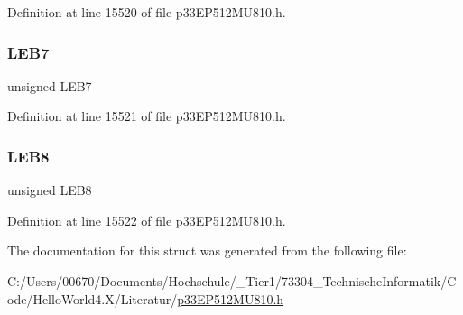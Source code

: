 Definition at line 15520 of file p33\+E\+P512\+M\+U810.\+h.

\mbox{\label{structtag_l_e_b_d_l_y6_b_i_t_s_aa76d586b04119d8459718019ddd964ef}} 
\subsubsection{\texorpdfstring{L\+E\+B7}{LEB7}}
{\footnotesize\ttfamily unsigned L\+E\+B7}



Definition at line 15521 of file p33\+E\+P512\+M\+U810.\+h.

\mbox{\label{structtag_l_e_b_d_l_y6_b_i_t_s_a9b22b47001301c6ae00c3eea0f385091}} 
\subsubsection{\texorpdfstring{L\+E\+B8}{LEB8}}
{\footnotesize\ttfamily unsigned L\+E\+B8}



Definition at line 15522 of file p33\+E\+P512\+M\+U810.\+h.



The documentation for this struct was generated from the following file\+:\begin{DoxyCompactItemize}
\item 
C\+:/\+Users/00670/\+Documents/\+Hochschule/\+\_\+\+Tier1/73304\+\_\+\+Technische\+Informatik/\+Code/\+Hello\+World4.\+X/\+Literatur/\hyperlink{p33_e_p512_m_u810_8h}{p33\+E\+P512\+M\+U810.\+h}\end{DoxyCompactItemize}
